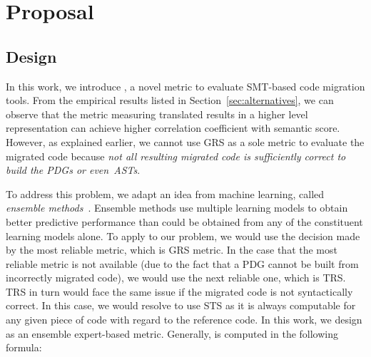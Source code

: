 \section{Proposal}
\label{sec:proposal}


\subsection{Design}

%

In this work, we introduce {\model}, a novel metric to evaluate
SMT-based code migration tools.  From the empirical results
listed in Section~\ref{sec:alternatives}, we can observe that the
metric measuring translated results in a higher level representation
can achieve higher correlation coefficient with semantic score.
However, as explained earlier, we cannot use GRS as a sole metric to
evaluate the migrated code because {\em not all resulting migrated
code is sufficiently correct to build the PDGs or even~ASTs}.

To address this problem, we adapt an idea from machine learning,
called {\em ensemble methods}~\cite{ensemble}. Ensemble methods
use multiple learning models to obtain better
predictive performance than could be obtained from any of the
constituent learning models alone.
To apply to our problem, we would use the decision made by the most
reliable metric, which is GRS metric. In the case that the most
reliable metric is not available (due to the fact that a PDG cannot
be built from incorrectly migrated code), we would use the next
reliable one, which is TRS. TRS in turn would face the same issue if
the migrated code is not syntactically correct. In this case, we would
resolve to use STS as it is always computable for any given piece of
code with regard to the reference code. In this work, we design 
{\model} as an ensemble expert-based metric. Generally, {\model} is 
computed in the following formula:

